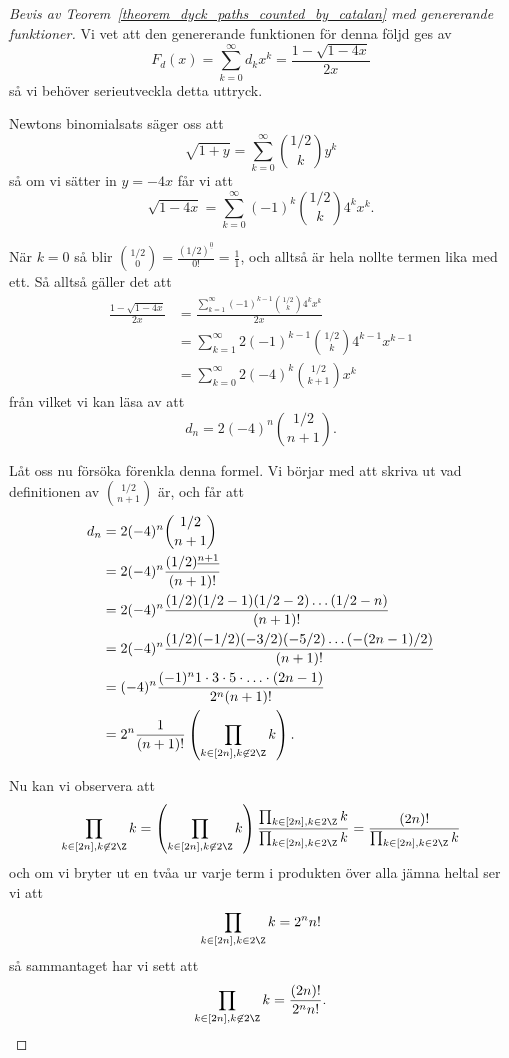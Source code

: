 \documentclass[nobib]{tufte-handout}
\begin{document}
\begin{proof}[Bevis av Teorem~\ref{theorem_dyck_paths_counted_by_catalan} med genererande funktioner]
    Vi vet att den genererande funktionen för denna följd ges av
    $$F_d(x) = \sum_{k=0}^{\infty} d_k x^k = \frac{1 - \sqrt{1 - 4x}}{2x}$$
    så vi behöver serieutveckla detta uttryck.

    Newtons binomialsats säger oss att
    $$\sqrt{1 + y} = \sum_{k=0}^{\infty} \binom{1/2}{k} y^k$$
    så om vi sätter in $y = -4x$ får vi att
    $$\sqrt{1 - 4x} = \sum_{k=0}^{\infty} (-1)^k \binom{1/2}{k} 4^k x^k.$$
    
    När $k=0$ så blir $\binom{1/2}{0} = \frac{(1/2)^{\underline{0}}}{0!} = \frac{1}{1}$, och alltså är hela nollte termen lika med ett. Så alltså gäller det att
    \begin{align*}
        \frac{1 - \sqrt{1 - 4x}}{2x} &= \frac{\sum_{k=1}^{\infty} (-1)^{k-1} \binom{1/2}{k} 4^k x^k}{2x}\\
        &= \sum_{k=1}^{\infty} 2(-1)^{k-1} \binom{1/2}{k} 4^{k-1} x^{k-1}\\
        &= \sum_{k=0}^{\infty} 2 (-4)^{k}\binom{1/2}{k+1} x^k
    \end{align*}
    från vilket vi kan läsa av att
    $$d_n = 2 (-4)^{n}\binom{1/2}{n+1}.$$

    Låt oss nu försöka förenkla denna formel. Vi börjar med att skriva ut vad definitionen av $\binom{1/2}{n+1}$ är, och får att
    \begin{align*}
        d_n &= 2 (-4)^{n}\binom{1/2}{n+1}\\
        &= 2 (-4)^n \frac{(1/2)^{\underline{n+1}}}{(n+1)!}\\
        &= 2 (-4)^n \frac{(1/2)(1/2 - 1)(1/2 - 2)\ldots(1/2 - n)}{(n+1)!}\\
        &= 2 (-4)^n \frac{(1/2)(-1/2)(-3/2)(-5/2)\ldots(-(2n-1)/2)}{(n+1)!}\\
        &= (-4)^n \frac{(-1)^n 1\cdot3\cdot5\cdot\ldots\cdot(2n-1)}{2^n (n+1)!}\\
        &= 2^n \frac{1}{(n+1)!}\left(\prod_{k \in [2n], k \not\in2\Z} k\right).
    \end{align*}

    Nu kan vi observera att
    $$\prod_{k \in [2n], k \not\in2\Z} k = \left(\prod_{k \in [2n], k \not\in2\Z} k\right)\frac{\prod_{k \in [2n], k \in2\Z} k}{\prod_{k \in [2n], k \in2\Z} k} = \frac{(2n)!}{\prod_{k \in [2n], k \in2\Z} k}$$
    och om vi bryter ut en tvåa ur varje term i produkten över alla jämna heltal ser vi att
    $$\prod_{k \in [2n], k \in2\Z} k = 2^n n!$$
    så sammantaget har vi sett att
    $$\prod_{k \in [2n], k \not\in2\Z} k = \frac{(2n)!}{2^n n!}.$$


\end{proof}
\end{document}
